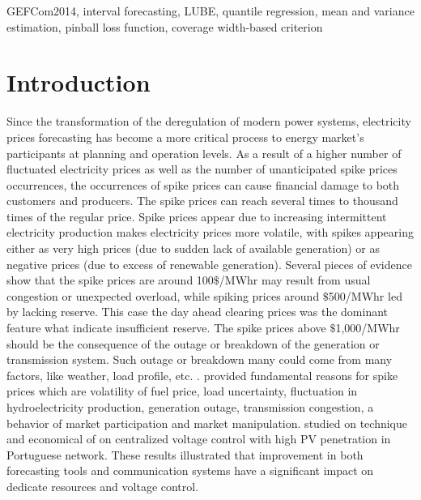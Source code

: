 \documentclass[review]{elsarticle}
\begin{document}
\begin{frontmatter}
    \begin{keyword}
      GEFCom2014, interval forecasting, LUBE, quantile regression, mean and variance estimation, pinball loss function, coverage width-based criterion
    \end{keyword}

  \end{frontmatter}

  \linenumbers

  \section{Introduction}

  Since the transformation of the deregulation of modern power systems, electricity prices forecasting has become a more critical process to energy market's participants at planning and operation levels.
  As a result of a higher number of fluctuated electricity prices as well as the number of unanticipated spike prices occurrences, the occurrences of spike prices can cause financial damage to both customers and producers.
  The spike prices can reach several times to thousand times of the regular price.
  Spike prices appear due to increasing intermittent electricity production makes electricity prices more volatile, with spikes appearing either as very high prices (due to sudden lack of available generation) or as negative prices (due to excess of renewable generation).
  Several pieces of evidence show that the spike prices are around 100$\$$/MWhr may result from usual congestion or unexpected overload, while spiking prices around $\$$500/MWhr led by lacking reserve.
  This case the day ahead clearing prices was the dominant feature what indicate insufficient reserve. The spike prices above $\$$1,000/MWhr should be the consequence of the outage or breakdown of the generation or transmission system.
  Such outage or breakdown many could come from many factors, like weather, load profile, etc. \cite{He2016}.
  \cite{SINGHAL2011550} provided fundamental reasons for spike prices which are volatility of fuel price, load uncertainty, fluctuation in hydroelectricity production, generation outage, transmission congestion, a behavior of market participation and market manipulation.
  \cite{GONZALEZSOTRES2017338} studied on technique and economical of on centralized voltage control with high PV penetration in Portuguese network.
  These results illustrated that improvement in both forecasting tools and communication systems have a significant impact on dedicate resources and voltage control.
\end{document}
